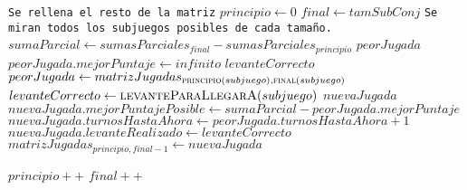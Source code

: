 \documentclass[11pt, a4paper, twoside]{article}
\begin{document}
\begin{algorithm}[H]
\begin{algorithmic}[1]
	\Statex
	\Statex \texttt{Se rellena el resto de la matriz}
							
		\State $principio \gets 0$											
		\State $final \gets tamSubConj$										
		\Statex \hspace{0.37cm} \texttt{Se miran todos los subjuegos posibles de cada tamaño.} 
												
			\State $sumaParcial \gets sumasParciales_{final} - sumasParciales_{principio}$ 
			\State $peorJugada$												
			\State $peorJugada.mejorPuntaje \gets infinito$					
			\State $levanteCorrecto$										
				 
					\State $peorJugada \gets matrizJugadas_{\Call{principio}{subjuego}, \Call{final}{subjuego}}$ 
					\State $levanteCorrecto \gets \Call{levanteParaLlegarA}{subjuego}$ 
				\EndIf
			\EndFor
			\State $nuevaJugada$											
			\State $nuevaJugada.mejorPuntajePosible \gets sumaParcial - peorJugada.mejorPuntaje$   
			\State $nuevaJugada.turnosHastaAhora \gets peorJugada.turnosHastaAhora +1$   
			\State $nuevaJugada.levanteRealizado \gets levanteCorrecto$		
			\State $matrizJugadas_{principio,final-1} \gets nuevaJugada$	
			
			\State $principio++$											
			\State $final++$												
		\EndWhile
	\EndFor
{}
\end{algorithmic}
\end{algorithm}
\end{document}

